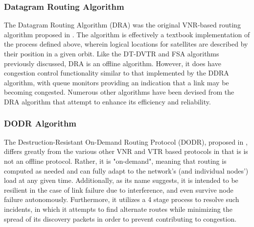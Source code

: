 \subsubsection{Datagram Routing Algorithm}\label{subsec:dra}
The Datagram Routing Algorithm (DRA) was the original VNR-based routing algorithm proposed in \cite{ekici_datagram_2000}. The algorithm is effectively a textbook implementation of the process defined above, wherein logical locations for satellites are described by their position in a given orbit. Like the DT-DVTR and FSA algorithms previously discussed, DRA is an offline algorithm. However, it does have congestion control functionality similar to that implemented by the DDRA algorithm, with queue monitors providing an indication that a link may be becoming congested. Numerous other algorithms have been devised from the DRA algorithm that attempt to enhance its efficiency and reliability.

\subsubsection{DODR Algorithm}\label{subsubsec:dodr}
The Destruction-Resistant On-Demand Routing Protocol (DODR), proposed in \cite{ji_destruction-resistant_2015}, differs greatly from the various other VNR and VTR based protocols in that is is not an offline protocol. Rather, it is "on-demand", meaning that routing is computed as needed and can fully adapt to the network's (and individual nodes') load at any given time. Additionally, as its name suggests, it is intended to be resilient in the case of link failure due to interference, and even survive node failure autonomously. Furthermore, it utilizes a 4 stage process to resolve such incidents, in which it attempts to find alternate routes while minimizing the spread of its discovery packets in order to prevent contributing to congestion.